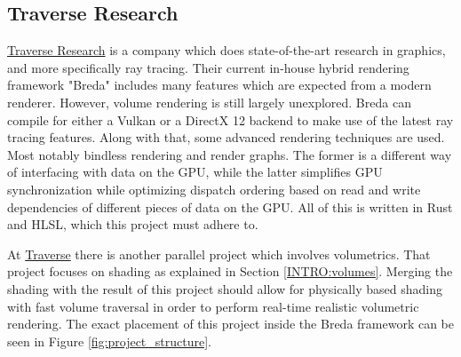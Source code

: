\subsection{Traverse Research} \label{INTRO:traverse}
\href{https://traverseresearch.nl/}{Traverse Research} is a company which does state-of-the-art research in graphics, and more specifically ray tracing. Their current in-house hybrid rendering framework "Breda" includes many features which are expected from a modern renderer. However, volume rendering is still largely unexplored. Breda can compile for either a Vulkan or a DirectX 12 backend to make use of the latest ray tracing features. Along with that, some advanced rendering techniques are used. Most notably bindless rendering\cite{BindlessRenderingSetup} and render graphs\cite{RenderGraph101}. The former is a different way of interfacing with data on the GPU, while the latter simplifies GPU synchronization while optimizing dispatch ordering based on read and write dependencies of different pieces of data on the GPU. All of this is written in Rust and HLSL, which this project must adhere to. 

At \href{https://traverseresearch.nl/}{Traverse} there is another parallel project which involves volumetrics. That project focuses on shading as explained in Section \ref{INTRO:volumes}. Merging the shading with the result of this project should allow for physically based shading with fast volume traversal in order to perform real-time realistic volumetric rendering. The exact placement of this project inside the Breda framework can be seen in Figure \ref{fig:project_structure}.

